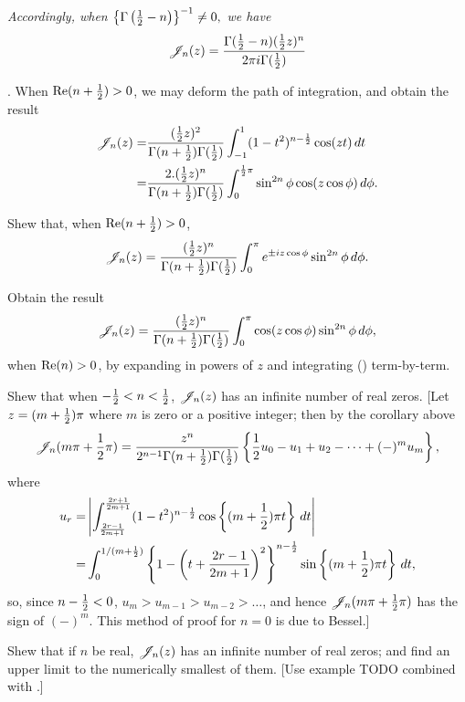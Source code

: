 \documentclass{book}
\begin{document}
\emph{Accordingly, when
  $
  \left\{ \Gamma\left( \frac{1}{2}-n \right) \right\}^{-1} \neq 0,
  $
  we have
  }
$$
\mathscr{J}_n(z)
=
\frac{ \Gamma(\frac{1}{2}-n) (\frac{1}{2} z)^n }{ 2\pi i \Gamma(\frac{1}{2})}
$$

\corollary. When $\mathrm{Re}(n+\frac{1}{2}) > 0$, we may deform the path of
integration, and obtain the result
\begin{align*}
  \mathscr{J}_n(z)
  =&
  \frac{ (\frac{1}{2} z)^2 }{ \Gamma(n+\frac{1}{2}) \Gamma(\frac{1}{2}) }
  \int_{-1}^1 (1-t^2)^{n-\frac{1}{2}} \cos(zt) \, d t
  \\
  =&
  \frac{2 . (\frac{1}{2} z)^n }{ \Gamma(n+\frac{1}{2}) \Gamma(\frac{1}{2}) }
  \int_0^{\frac{1}{2} \pi} \sin^{2n}\phi \cos(z \cos\phi) \, d\phi.
\end{align*}
\begin{wandwexample}
  Shew that, when $\mathrm{Re}(n+\frac{1}{2}) > 0$,
  $$
  \mathscr{J}_n(z)
  =
  \frac{ (\frac{1}{2} z)^n }{ \Gamma(n+\frac{1}{2}) \Gamma(\frac{1}{2}) }
  \int_0^{\pi} e^{\pm iz\cos\phi} \sin^{2n}\phi \, d\phi.
  $$
\end{wandwexample}
\begin{wandwexample}
  Obtain the result
  $$
  \mathscr{J}_n(z)
  =
  \frac{ (\frac{1}{2} z)^n }{ \Gamma(n+\frac{1}{2}) \Gamma(\frac{1}{2}) }
  \int_0^{\pi} \cos(z\cos\phi) \sin^{2n}\phi \, d\phi,
  $$
  when $\mathrm{Re}(n) > 0$, by expanding in powers of $z$ and
  integrating
  () term-by-term.
\end{wandwexample}
%
%
\begin{wandwexample}
  Shew that when $-\frac{1}{2} < n < \frac{1}{2}$, $\mathscr{J}_n(z)$ has an infinite number
  of real zeros. [Let $z = (m+\frac{1}{2})\pi$ where $m$ is zero or a
  positive integer; then by the corollary above
  $$
  \mathscr{J}_n(m\pi + \frac{1}{2}\pi)
  =
  \frac{z^n}{2^{n-1} \Gamma(n+\frac{1}{2}) \Gamma(\frac{1}{2})}
  \left\{  \frac{1}{2} u_0 - u_1 + u_2 - \cdots + (-)^m u_m \right\},
  $$
  where
  \begin{align*}
    u_r
    =&
    \left| 
      \int_{\frac{2r-1}{2m+1}}^{\frac{2r+1}{2m+1}}
      (1-t^2)^{n-\frac{1}{2}} \cos \left\{ (m+\frac{1}{2})\pi t \right\}
      \, d t
     \right|
    \\
    =&
    \int_0^{1/(m+\frac{1}{2})}
    \left\{ 
      1
      -
      \left( t + \frac{2r-1}{2m+1} \right)^2
     \right\}^{n-\frac{1}{2}}
    \sin\left\{  (m+\frac{1}{2})\pi t  \right\}
    \, d t,
  \end{align*}
  so, since $n - \frac{1}{2} < 0$, $u_m > u_{m-1} > u_{m-2} > \ldots$, and
  hence $\mathscr{J}_n(m\pi + \frac{1}{2}\pi)$ has the sign of $(-)^m$.
  This method of proof for $n=0$ is due to Bessel.]
\end{wandwexample}
\begin{wandwexample}
  Shew that if $n$ be real, $\mathscr{J}_n(z)$ has an infinite number of real
  zeros; and find an upper limit to the numerically smallest of them.
  [Use example TODO combined with .]
\end{wandwexample}
\end{document}
